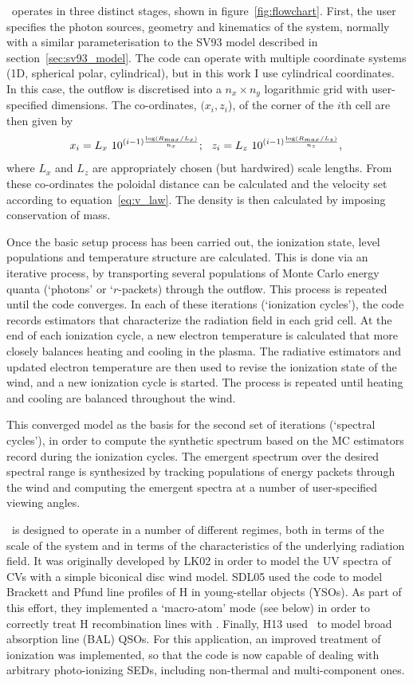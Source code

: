 \py\ operates in three distinct stages, shown in figure~\ref{fig:flowchart}. 
First, the user specifies the photon sources,
geometry and kinematics of the system, normally with a similar parameterisation
to the SV93 model described in section~\ref{sec:sv93_model}. 
The code can operate with multiple coordinate systems 
(1D, spherical polar, cylindrical), but in this work I use cylindrical coordinates.
In this case, the outflow is discretised into a $n_x \times n_y$ logarithmic grid with 
user-specified dimensions. The co-ordinates, $(x_i, z_i$), 
of the corner of the $i$th cell are then given by
\begin{equation}
x_i = L_{x}~10^{(i-1)\frac{\log (R_{max} / L_{x})}{n_x}};~~
z_i = L_{z}~10^{(i-1)\frac{\log (R_{max} / L_{z})}{n_z}}, \\
\end{equation}
where $L_x$ and $L_z$ are appropriately chosen (but hardwired) scale lengths.
From these co-ordinates the poloidal distance can be calculated and
the velocity set according to equation~\ref{eq:v_law}. The density
is then calculated by imposing conservation of mass.

Once the basic setup process has been carried out, the ionization state,
level populations and temperature structure are calculated.
This is done via an iterative process, by transporting several populations of 
Monte Carlo energy quanta (`photons' or `$r$-packets) through the outflow.
This process is repeated until the code converges. 
In each of these iterations (`ionization cycles'), the code records estimators that 
characterize the radiation field in each grid cell. At the end 
of each ionization cycle, a new electron temperature is calculated
that more closely balances heating and cooling in the 
plasma. The radiative estimators and updated electron
temperature are then used to revise the ionization state of the wind,
and a new ionization cycle is started. The process is repeated until
heating and cooling are balanced throughout the wind. 

This converged model as the basis for the second set of
iterations (`spectral cycles'), in order to compute the synthetic spectrum based on the 
MC estimators record during the ionization cycles. 
The emergent spectrum over the desired spectral range is synthesized by 
tracking populations of energy packets through the wind and computing the emergent spectra at
a number of user-specified viewing angles.  

\py\ is designed to operate in a number of different
regimes, both in terms of the scale of the system and in terms of the
characteristics of the underlying radiation field.
It was originally developed by LK02 in order to model the UV spectra
of CVs with a simple biconical disc wind model. SDL05
\nocite{simmacro2005} used the code to model Brackett
and Pfund line profiles of H in young-stellar objects (YSOs). As part
of this effort, they implemented a `macro-atom' mode (see below) in
order to correctly treat H recombination lines with
\py. Finally, H13 used \py\ to model broad absorption line (BAL) QSOs. For
this application, an improved treatment of ionization was implemented,
so that the code is now capable of dealing with arbitrary
photo-ionizing SEDs, including non-thermal and multi-component ones. 


